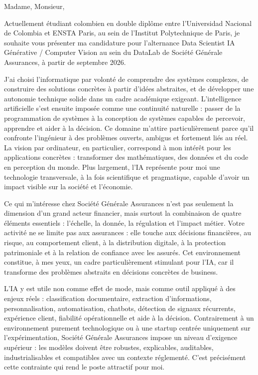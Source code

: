 \documentclass[10pt,a4paper]{article}
\begin{document}
{\small

Madame, Monsieur,

Actuellement étudiant colombien en double diplôme entre l’Universidad Nacional de Colombia et ENSTA Paris, au sein de l’Institut Polytechnique de Paris, je souhaite vous présenter ma candidature pour l’alternance Data Scientist IA Générative / Computer Vision au sein du DataLab de Société Générale Assurances, à partir de septembre 2026.

J’ai choisi l’informatique par volonté de comprendre des systèmes complexes, de construire des solutions concrètes à partir d’idées abstraites, et de développer une autonomie technique solide dans un cadre académique exigeant. L’intelligence artificielle s’est ensuite imposée comme une continuité naturelle : passer de la programmation de systèmes à la conception de systèmes capables de percevoir, apprendre et aider à la décision. Ce domaine m’attire particulièrement parce qu’il confronte l’ingénieur à des problèmes ouverts, ambigus et fortement liés au réel. La vision par ordinateur, en particulier, correspond à mon intérêt pour les applications concrètes : transformer des mathématiques, des données et du code en perception du monde. Plus largement, l’IA représente pour moi une technologie transversale, à la fois scientifique et pragmatique, capable d’avoir un impact visible sur la société et l’économie.

Ce qui m’intéresse chez Société Générale Assurances n’est pas seulement la dimension d’un grand acteur financier, mais surtout la combinaison de quatre éléments essentiels : l’échelle, la donnée, la régulation et l’impact métier. Votre activité ne se limite pas aux assurances : elle touche aux décisions financières, au risque, au comportement client, à la distribution digitale, à la protection patrimoniale et à la relation de confiance avec les assurés. Cet environnement constitue, à mes yeux, un cadre particulièrement stimulant pour l’IA, car il transforme des problèmes abstraits en décisions concrètes de business.

L’IA y est utile non comme effet de mode, mais comme outil appliqué à des enjeux réels : classification documentaire, extraction d’informations, personnalisation, automatisation, chatbots, détection de signaux récurrents, expérience client, fiabilité opérationnelle et aide à la décision. Contrairement à un environnement purement technologique ou à une startup centrée uniquement sur l’expérimentation, Société Générale Assurances impose un niveau d’exigence supérieur : les modèles doivent être robustes, explicables, auditables, industrialisables et compatibles avec un contexte réglementé. C’est précisément cette contrainte qui rend le poste attractif pour moi.

}
\end{document}

